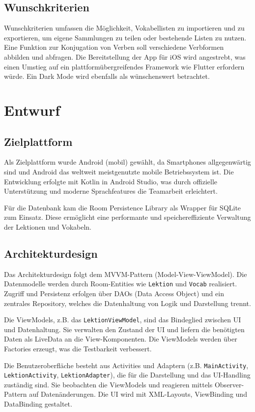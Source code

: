 \documentclass[12pt,a4paper]{article}
\begin{document}
\subsection{Wunschkriterien}
Wunschkriterien umfassen die Möglichkeit, Vokabellisten zu importieren und zu exportieren, um eigene Sammlungen zu teilen oder bestehende Listen zu nutzen. Eine Funktion zur Konjugation von Verben soll verschiedene Verbformen abbilden und abfragen. Die Bereitstellung der App für iOS wird angestrebt, was einen Umstieg auf ein plattformübergreifendes Framework wie Flutter erfordern würde. Ein Dark Mode wird ebenfalls als wünschenswert betrachtet.

\section{Entwurf}

\subsection{Zielplattform}
Als Zielplattform wurde Android (mobil) gewählt, da Smartphones allgegenwärtig sind und Android das weltweit meistgenutzte mobile Betriebssystem ist. Die Entwicklung erfolgte mit Kotlin in Android Studio, was durch offizielle Unterstützung und moderne Sprachfeatures die Teamarbeit erleichtert.

Für die Datenbank kam die Room Persistence Library als Wrapper für SQLite zum Einsatz. Diese ermöglicht eine performante und speichereffiziente Verwaltung der Lektionen und Vokabeln.

\subsection{Architekturdesign}
Das Architekturdesign folgt dem MVVM-Pattern (Model-View-ViewModel). Die Datenmodelle werden durch Room-Entities wie \texttt{Lektion} und \texttt{Vocab} realisiert. Zugriff und Persistenz erfolgen über DAOs (Data Access Object) und ein zentrales Repository, welches die Datenhaltung von Logik und Darstellung trennt.

Die ViewModels, z.B. das \texttt{LektionViewModel}, sind das Bindeglied zwischen UI und Datenhaltung. Sie verwalten den Zustand der UI und liefern die benötigten Daten als LiveData an die View-Komponenten. Die ViewModels werden über Factories erzeugt, was die Testbarkeit verbessert.

Die Benutzeroberfläche besteht aus Activities und Adaptern (z.B. \texttt{MainActivity}, \texttt{LektionActivity}, \texttt{LektionAdapter}), die für die Darstellung und das UI-Handling zuständig sind. Sie beobachten die ViewModels und reagieren mittels Observer-Pattern auf Datenänderungen. Die UI wird mit XML-Layouts, ViewBinding und DataBinding gestaltet.
\end{document}
